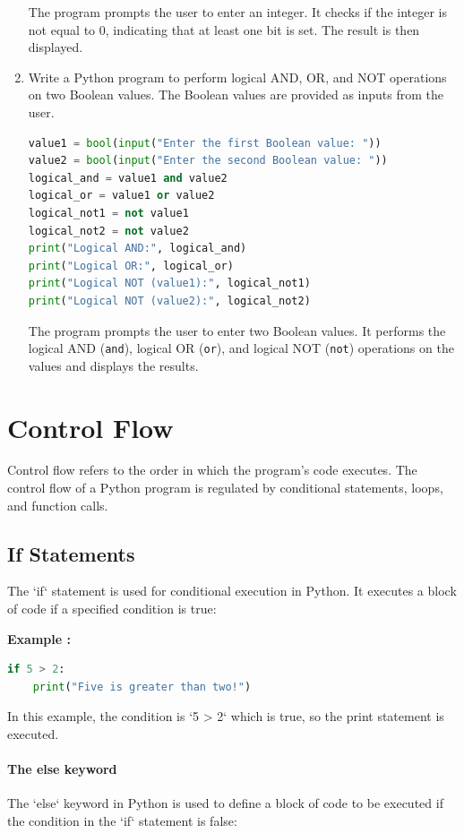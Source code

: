 \documentclass[12pt]{book}
\newtheorem{Example}{Example}[chapter]
\renewenvironment{Example}{\begin{trivlist}\item\relax
\textbf{Example \thesection: }}{\end{trivlist}}
\begin{document}
\begin{enumerate}
The program prompts the user to enter an integer. It checks if the integer is not equal to 0, indicating that at least one bit is set. The result is then displayed.

\item Write a Python program to perform logical AND, OR, and NOT operations on two Boolean values. The Boolean values are provided as inputs from the user.

\begin{lstlisting}[language=Python]
value1 = bool(input("Enter the first Boolean value: "))
value2 = bool(input("Enter the second Boolean value: "))
logical_and = value1 and value2
logical_or = value1 or value2
logical_not1 = not value1
logical_not2 = not value2
print("Logical AND:", logical_and)
print("Logical OR:", logical_or)
print("Logical NOT (value1):", logical_not1)
print("Logical NOT (value2):", logical_not2)
\end{lstlisting}

The program prompts the user to enter two Boolean values. It performs the logical AND (\texttt{and}), logical OR (\texttt{or}), and logical NOT (\texttt{not}) operations on the values and displays the results.

\end{enumerate}

\newpage
\newpage
\chapter{Control Flow}
Control flow refers to the order in which the program's code executes. The control flow of a Python program is regulated by conditional statements, loops, and function calls.

\section{If Statements}

The `if` statement is used for conditional execution in Python. It executes a block of code if a specified condition is true:
\begin{Example}
\begin{lstlisting}[language=Python]
if 5 > 2:
    print("Five is greater than two!")
\end{lstlisting}
\end{Example}
In this example, the condition is `5 > 2` which is true, so the print statement is executed.


\subsubsection{The else keyword}
The `else` keyword in Python is used to define a block of code to be executed if the condition in the `if` statement is false:
\end{document}
